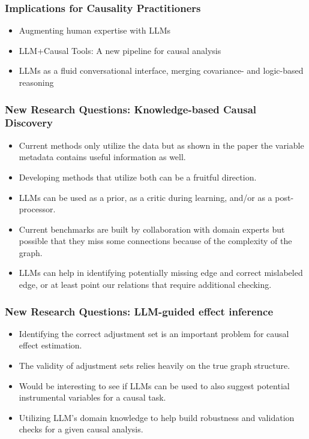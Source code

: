 \documentclass{beamer}
\begin{document}
\begin{frame}
	\frametitle{Implications for Causality Practitioners}
	\begin{itemize}
		\item Augmenting human expertise with LLMs
		\item LLM+Causal Tools: A new pipeline for causal analysis
		\item LLMs as a fluid conversational interface, merging covariance-
			and logic-based reasoning
	\end{itemize}
\end{frame}

\begin{frame}
	\frametitle{New Research Questions: Knowledge-based Causal Discovery}
	\begin{itemize}
		\item Current methods only utilize the data but as shown in the
			paper the variable metadata contains useful information
			as well.
		\item Developing methods that utilize both can be a fruitful direction.
		\item LLMs can be used as a prior, as a critic during learning, and/or
			as a post-processor.
		\item Current benchmarks are built by collaboration with domain 
			experts but possible that they miss some connections because
			of the complexity of the graph.
		\item LLMs can help in identifying potentially missing edge and 
			correct mislabeled edge, or at least point our relations
			that require additional checking.
	\end{itemize}
\end{frame}

\begin{frame}
	\frametitle{New Research Questions: LLM-guided effect inference}
	\begin{itemize}
		\item Identifying the correct adjustment set is an important problem
			for causal effect estimation.
		\item The validity of adjustment sets relies heavily on the true
			graph structure.
		\item Would be interesting to see if LLMs can be used to also
			suggest potential instrumental variables for a causal task.
		\item Utilizing LLM's domain knowledge to help build robustness
			and validation checks for a given causal analysis.
	\end{itemize}
\end{frame}
\end{document}
